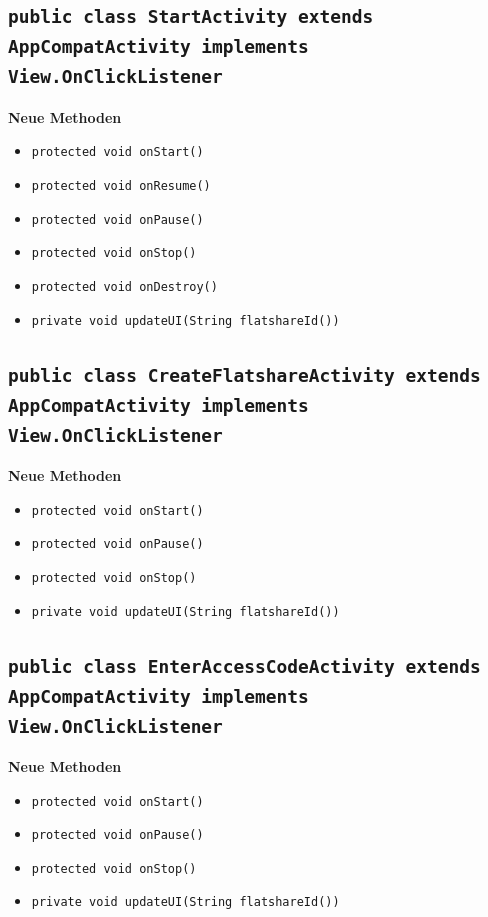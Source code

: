\documentclass[a4paper]{scrreprt}
\begin{document}
	\subsection{\texttt{public class StartActivity extends AppCompatActivity implements View.OnClickListener}}
		\textbf{Neue Methoden}
			\begin{itemize}
			\item \texttt{protected void onStart()}
			\item \texttt{protected void onResume()}
			\item \texttt{protected void onPause()}
			\item \texttt{protected void onStop()}
			\item \texttt{protected void onDestroy()}
			\item \texttt{private void updateUI(String flatshareId())}
		\end{itemize}
			
	\subsection{\texttt{public class CreateFlatshareActivity extends AppCompatActivity implements View.OnClickListener}}
		\textbf{Neue Methoden}
		\begin{itemize}
			\item \texttt{protected void onStart()}
			\item \texttt{protected void onPause()}
			\item \texttt{protected void onStop()}
			\item \texttt{private void updateUI(String flatshareId())}
		\end{itemize}
	
	\subsection{\texttt{public class EnterAccessCodeActivity extends AppCompatActivity implements View.OnClickListener}}
		\textbf{Neue Methoden}
		\begin{itemize}
			\item \texttt{protected void onStart()}
			\item \texttt{protected void onPause()}
			\item \texttt{protected void onStop()}
			\item \texttt{private void updateUI(String flatshareId())}
		\end{itemize}
			
\end{document}
